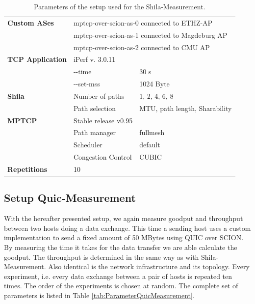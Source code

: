 \begin{table} [H]
	\centering
	\begin{tabular}{lll} 
		\toprule
		\textbf{Custom ASes} 		& \multicolumn{2}{l}{mptcp-over-scion-as-0 connected to ETHZ-AP}				\\
							 		& \multicolumn{2}{l}{mptcp-over-scion-as-1 connected to Magdeburg AP}			\\
							 		& \multicolumn{2}{l}{mptcp-over-scion-as-2 connected to CMU AP}					\smallskip \\ 
		\textbf{TCP Application}	& iPerf v. 3.0.11								&								\\
									& -\vspace{0 px}-time										& 30 s				\\
									& -\vspace{0 px}-set-mss										& 1024 Byte		\smallskip	\\
		\textbf{Shila}				&  Number of paths								& 1, 2, 4, 6, 8					\\
									& Path selection				 				& MTU, path length, Sharability \smallskip\\
		\textbf{MPTCP}				& Stable release v0.95							&								\\
									& Path manager									& fullmesh						\\
									& Scheduler										& default						\\
									& Congestion Control							& CUBIC							\smallskip\\
		\textbf{Repetitions} 		& 10  											&								\\
		\bottomrule
	\end{tabular}
	\caption{Parameters of the setup used for the Shila-Measurement.}
	\label{tab:ParameterShilaMeasurement}
\end{table}

\subsection*{Setup Quic-Measurement}

With the hereafter presented setup, we again measure goodput and throughput between two hosts doing a data exchange. This time a sending host uses a custom implementation to send a fixed amount of 50 MBytes using QUIC over SCION. By measuring the time it takes for the data transfer we are able calculate the goodput. The throughput is determined in the same way as with Shila-Measurement. Also identical is the network infrastructure and its topology. Every experiment, i.e. every data exchange between a pair of hosts is repeated ten times. The order of the experiments is chosen at random. The complete set of parameters is listed in Table \ref{tab:ParameterQuicMeasurement}.

